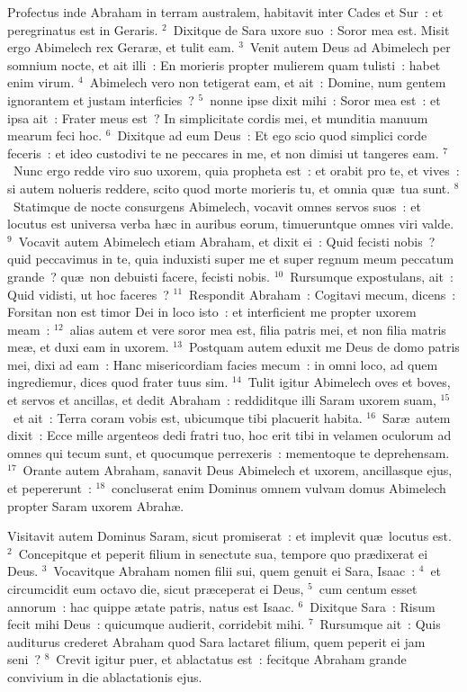 \lettrine[lines=3,image=true,loversize=0.05,lraise=-0.03]{P}{}rofectus inde Abraham in terram australem, habitavit inter Cades et Sur~: et peregrinatus est in Geraris.
${}^{2}$~Dixitque de Sara uxore suo~: Soror mea est. Misit ergo Abimelech rex Gerar\ae , et tulit eam.
${}^{3}$~Venit autem Deus ad Abimelech per somnium nocte, et ait illi~: En morieris propter mulierem quam tulisti~: habet enim virum.
${}^{4}$~Abimelech vero non tetigerat eam, et ait~: Domine, num gentem ignorantem et justam interficies~?
${}^{5}$~nonne ipse dixit mihi~: Soror mea est~: et ipsa ait~: Frater meus est~? In simplicitate cordis mei, et munditia manuum mearum feci hoc.
${}^{6}$~Dixitque ad eum Deus~: Et ego scio quod simplici corde feceris~: et ideo custodivi te ne peccares in me, et non dimisi ut tangeres eam.
${}^{7}$~Nunc ergo redde viro suo uxorem, quia propheta est~: et orabit pro te, et vives~: si autem nolueris reddere, scito quod morte morieris tu, et omnia qu\ae\ tua sunt.
${}^{8}$~Statimque de nocte consurgens Abimelech, vocavit omnes servos suos~: et locutus est universa verba h\ae c in auribus eorum, timueruntque omnes viri valde.
${}^{9}$~Vocavit autem Abimelech etiam Abraham, et dixit ei~: Quid fecisti nobis~? quid peccavimus in te, quia induxisti super me et super regnum meum peccatum grande~? qu\ae\ non debuisti facere, fecisti nobis.
${}^{10}$~Rursumque expostulans, ait~: Quid vidisti, ut hoc faceres~?
${}^{11}$~Respondit Abraham~: Cogitavi mecum, dicens~: Forsitan non est timor Dei in loco isto~: et interficient me propter uxorem meam~:
${}^{12}$~alias autem et vere soror mea est, filia patris mei, et non filia matris me\ae , et duxi eam in uxorem.
${}^{13}$~Postquam autem eduxit me Deus de domo patris mei, dixi ad eam~: Hanc misericordiam facies mecum~: in omni loco, ad quem ingrediemur, dices quod frater tuus sim.
${}^{14}$~Tulit igitur Abimelech oves et boves, et servos et ancillas, et dedit Abraham~: reddiditque illi Saram uxorem suam,
${}^{15}$~et ait~: Terra coram vobis est, ubicumque tibi placuerit habita.
${}^{16}$~Sar\ae\ autem dixit~: Ecce mille argenteos dedi fratri tuo, hoc erit tibi in velamen oculorum ad omnes qui tecum sunt, et quocumque perrexeris~: mementoque te deprehensam.
${}^{17}$~Orante autem Abraham, sanavit Deus Abimelech et uxorem, ancillasque ejus, et pepererunt~:
${}^{18}$~concluserat enim Dominus omnem vulvam domus Abimelech propter Saram uxorem Abrah\ae .

\lettrine[lines=3,image=true,loversize=0.05,lraise=-0.03]{V}{}isitavit autem Dominus Saram, sicut promiserat~: et implevit qu\ae\ locutus est.
${}^{2}$~Concepitque et peperit filium in senectute sua, tempore quo pr\ae dixerat ei Deus.
${}^{3}$~Vocavitque Abraham nomen filii sui, quem genuit ei Sara, Isaac~:
${}^{4}$~et circumcidit eum octavo die, sicut pr\ae ceperat ei Deus,
${}^{5}$~cum centum esset annorum~: hac quippe \ae tate patris, natus est Isaac.
${}^{6}$~Dixitque Sara~: Risum fecit mihi Deus~: quicumque audierit, corridebit mihi.
${}^{7}$~Rursumque ait~: Quis auditurus crederet Abraham quod Sara lactaret filium, quem peperit ei jam seni~?
${}^{8}$~Crevit igitur puer, et ablactatus est~: fecitque Abraham grande convivium in die ablactationis ejus.


